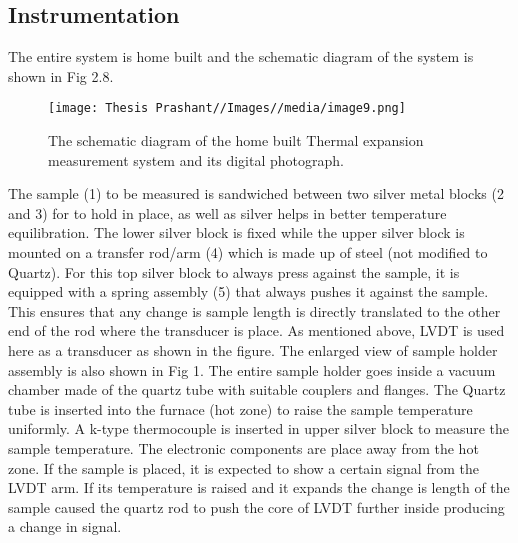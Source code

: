 \subsection{Instrumentation}
The entire system is home built and the schematic diagram of the system is shown in Fig 2.8. 
\begin{figure}
    \centering
    \texttt{[image: Thesis Prashant//Images//media/image9.png]}
    \caption{The schematic diagram of the home built Thermal expansion measurement system and its digital
photograph.}
    \label{fig:enter-label}
\end{figure}
The sample (1) to be measured is sandwiched between two silver metal blocks (2 and 3) for to hold in place, as well as silver helps in better temperature equilibration. The lower silver block is fixed while the upper silver block is mounted on a transfer rod/arm (4) which is made up of steel (not modified to Quartz). For this top silver block to always press against the sample, it is equipped with a spring assembly (5) that always pushes it against the sample. This ensures that
any change is sample length is directly translated to the other end of the rod where the transducer is place. As mentioned above, LVDT is used here as a transducer as shown in the figure.
The enlarged view of sample holder assembly is also shown in Fig 1. The entire sample
holder goes inside a vacuum chamber made of the quartz tube with suitable couplers and flanges.
The Quartz tube is inserted into the furnace (hot zone) to raise the sample temperature uniformly.
A k-type thermocouple is inserted in upper silver block to measure the sample temperature. The
electronic components are place away from the hot zone. If the sample is placed, it is expected to show a certain signal from the LVDT arm. If its temperature is raised and it expands the change is length of the sample caused the quartz rod to
push the core of LVDT further inside producing a change in signal.

